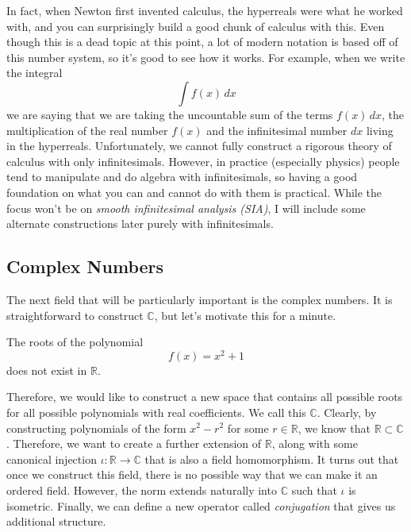 \documentclass{article}
\begin{document}
    In fact, when Newton first invented calculus, the hyperreals were what he worked with, and you can surprisingly build a good chunk of calculus with this. Even though this is a dead topic at this point, a lot of modern notation is based off of this number system, so it's good to see how it works. For example, when we write the integral 
    \begin{equation}
      \int f(x) \,dx
    \end{equation} 
    we are saying that we are taking the uncountable sum of the terms $f(x) \,dx$, the multiplication of the real number $f(x)$ and the infinitesimal number $dx$ living in the hyperreals. Unfortunately, we cannot fully construct a rigorous theory of calculus with only infinitesimals. However, in practice (especially physics) people tend to manipulate and do algebra with infinitesimals, so having a good foundation on what you can and cannot do with them is practical. While the focus won't be on \textit{smooth infinitesimal analysis (SIA)}, I will include some alternate constructions later purely with infinitesimals. 

  \subsection{Complex Numbers} 

    The next field that will be particularly important is the complex numbers. It is straightforward to construct $\mathbb{C}$, but let's motivate this for a minute. 

    \begin{example}
      The roots of the polynomial 
      \begin{equation}
        f(x) = x^2 + 1
      \end{equation}
      does not exist in $\mathbb{R}$. 
    \end{example} 

    Therefore, we would like to construct a new space that contains all possible roots for all possible polynomials with real coefficients. We call this $\mathbb{C}$. Clearly, by constructing polynomials of the form $x^2 - r^2$ for some $r \in \mathbb{R}$, we know that $\mathbb{R} \subset \mathbb{C}$. Therefore, we want to create a further extension of $\mathbb{R}$, along with some canonical injection $\iota: \mathbb{R} \rightarrow \mathbb{C}$ that is also a field homomorphism. It turns out that once we construct this field, there is no possible way that we can make it an ordered field. However, the norm extends naturally into $\mathbb{C}$ such that $\iota$ is isometric. Finally, we can define a new operator called \textit{conjugation} that gives us additional structure. 
\end{document}
